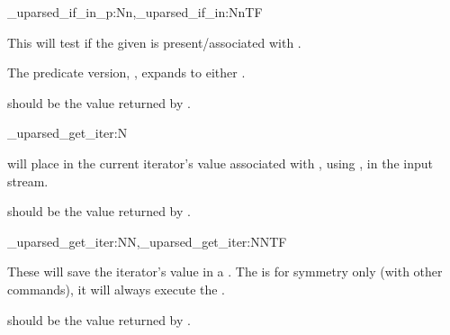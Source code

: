\documentclass[10pt]{article}
\begin{document}
\begin{codedescribe}[code,EXP,new=2023/11/28,update=2025/12/08]{\starray_uparsed_if_in_p:Nn,\starray_uparsed_if_in:NnTF}
\begin{codesyntax}%
\end{codesyntax}
This will test if the given  is present/associated with .
\end{codedescribe}
\begin{tsremark}
The predicate version, , expands to either .
\end{tsremark}
\begin{tsremark}
 should be the value returned by  .
\end{tsremark}


\begin{codedescribe}[code,EXP,new=2023/11/28,update=2025/12/08]{\starray_uparsed_get_iter:N}
\begin{codesyntax}%
\end{codesyntax}
 will place in the current iterator's value associated with ,  using , in the input stream.
\end{codedescribe}
\begin{tsremark}
 should be the value returned by  .
\end{tsremark}

\begin{codedescribe}[code,new=2025/10/25,update=2025/12/08]{\starray_uparsed_get_iter:NN,\starray_uparsed_get_iter:NNTF}
\begin{codesyntax}%
\end{codesyntax}
These will save the iterator’s value  in a . The   is  for symmetry only (with other commands), it will always execute the  .
\end{codedescribe}
\begin{tsremark}
 should be the value returned by  .
\end{tsremark}
\end{document}
